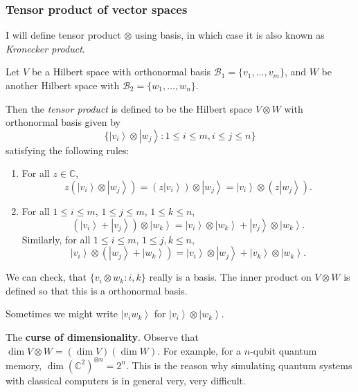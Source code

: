 \subsubsection{Tensor product of vector spaces}


I will define tensor product $\otimes $ using basis, in which case it is also known as \textit{Kronecker product}. 

Let $V$ be a Hilbert space with orthonormal basis $\mathcal{B}_1 = \{v_1, \ldots, v_m\} $, and $W$ be another Hilbert space with $\mathcal{B}_2 = \{w_1, \ldots, w_n\} $.

Then the \textit{tensor product} is defined to be the Hilbert space $V \otimes W$ with orthonormal basis given by
\[
	\{\left| v_i \right\rangle  \otimes \left| w_j \right\rangle : 1 \le  i \le m, i \le j \le  n\} 
\] 
satisfying the following rules:
\begin{enumerate}
	\item For all $z \in \mathbb{C}$, 
		\[
			z\left( \left| v_i \right\rangle  \otimes  \left| w_j \right\rangle  \right)  = \left( z \left| v_i \right\rangle  \right) \otimes  \left| w_j \right\rangle  = \left| v_i \right\rangle  \otimes  \left( z \left| w_j \right\rangle  \right) 
		.\] 
	\item For all $1 \le i \le m$, $1 \le  j \le m$, $1 \le  k \le  n$, 
		\[
			\left( \left| v_i \right\rangle  + \left| v_j \right\rangle  \right)  \otimes  \left| w_k \right\rangle  = 
			\left| v_i \right\rangle  \otimes  \left| w_k \right\rangle  + \left| v_j \right\rangle  \otimes  \left| w_k \right\rangle 
		.\] 
		Similarly, for all $1 \le  i \le m$, $1 \le  j, k \le n$,
		\[
			\left| v_i \right\rangle  \otimes  \left( \left| w_j \right\rangle  + \left| w_k \right\rangle  \right) 
			= \left| v_i \right\rangle  \otimes  \left| w_j \right\rangle  + \left| v_k \right\rangle  \otimes  \left| w_k \right\rangle 
		.\] 
\end{enumerate}
We can check, that $\{v_i \otimes  w_k: i, k\} $ really is a basis. The inner product on $V \otimes W$ is defined so that this is a orthonormal basis.

Sometimes we might write $\left| v_i w_k \right\rangle $ for $\left| v_i \right\rangle  \otimes \left| w_k \right\rangle $.



The \textbf{curse of dimensionality}. Observe that $\operatorname{dim} V \otimes W = \left( \operatorname{dim} V \right)  \left( \operatorname{dim} W \right) .$ 
For example, for a $n$-qubit quantum memory, $\operatorname{dim} \left( \mathbb{C}^2 \right) ^{\otimes  n} = 2^n .$ This is the reason why simulating quantum systems with classical computers is in general very, very difficult.

